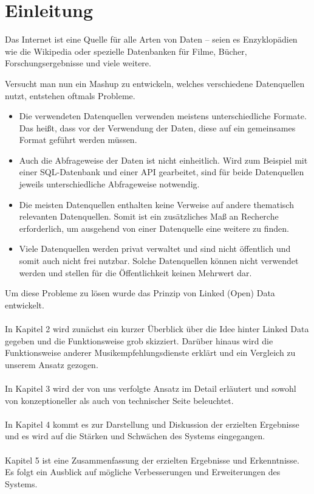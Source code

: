 \section{Einleitung}

Das Internet ist eine Quelle für alle Arten von Daten -- seien es Enzyklopädien wie die Wikipedia oder spezielle Datenbanken für Filme, Bücher, Forschungsergebnisse und viele weitere.


Versucht man nun ein Mashup zu entwickeln, welches verschiedene Datenquellen nutzt, entstehen oftmals Probleme.

\begin{itemize}
\item Die verwendeten Datenquellen verwenden meistens unterschiedliche Formate. Das heißt, dass vor der Verwendung der Daten, diese auf ein gemeinsames Format geführt werden müssen.
\item Auch die Abfrageweise der Daten ist nicht einheitlich. Wird zum Beispiel mit einer SQL-Datenbank und einer API gearbeitet, sind für beide Datenquellen jeweils unterschiedliche Abfrageweise notwendig.
\item Die meisten Datenquellen enthalten keine Verweise auf andere thematisch relevanten Datenquellen. Somit ist ein zusätzliches Maß an Recherche erforderlich, um ausgehend von einer Datenquelle eine weitere zu finden.
\item Viele Datenquellen werden privat verwaltet und sind nicht öffentlich und somit auch nicht frei nutzbar. Solche Datenquellen können nicht verwendet werden und stellen für die Öffentlichkeit keinen Mehrwert dar.
\end{itemize}

Um diese Probleme zu lösen wurde das Prinzip von Linked (Open) Data entwickelt.

\paragraph{} In Kapitel 2 wird zunächst ein kurzer Überblick über die Idee hinter Linked Data gegeben und die Funktionsweise grob skizziert. Darüber hinaus wird die Funktionsweise anderer Musikempfehlungsdienste	 erklärt und ein Vergleich zu unserem Ansatz gezogen.

\paragraph{} In Kapitel 3 wird der von uns verfolgte Ansatz im Detail erläutert und sowohl von konzeptioneller als auch von technischer Seite beleuchtet.

\paragraph{} In Kapitel 4 kommt es zur Darstellung und Diskussion der erzielten Ergebnisse und es wird auf die Stärken und Schwächen des Systems eingegangen.

\paragraph{} Kapitel 5 ist eine Zusammenfassung der erzielten Ergebnisse und Erkenntnisse. Es folgt ein Ausblick auf mögliche Verbesserungen und Erweiterungen des Systems.